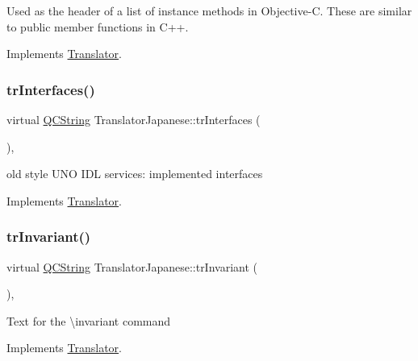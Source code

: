 Used as the header of a list of instance methods in Objective-\/C. These are similar to public member functions in C++. 

Implements \mbox{\hyperlink{class_translator}{Translator}}.

\mbox{\label{class_translator_japanese_ab202913125e78765f22b022c382e1c75}} 
\subsubsection{\texorpdfstring{trInterfaces()}{trInterfaces()}}
{\footnotesize\ttfamily virtual \mbox{\hyperlink{class_q_c_string}{Q\+C\+String}} Translator\+Japanese\+::tr\+Interfaces (\begin{DoxyParamCaption}{ }\end{DoxyParamCaption})\hspace{0.3cm}{\ttfamily [inline]}, {\ttfamily [virtual]}}

old style U\+NO I\+DL services\+: implemented interfaces 

Implements \mbox{\hyperlink{class_translator}{Translator}}.

\mbox{\label{class_translator_japanese_ad4cd27f745b3a8024d8c2886a9df93fd}} 
\subsubsection{\texorpdfstring{trInvariant()}{trInvariant()}}
{\footnotesize\ttfamily virtual \mbox{\hyperlink{class_q_c_string}{Q\+C\+String}} Translator\+Japanese\+::tr\+Invariant (\begin{DoxyParamCaption}{ }\end{DoxyParamCaption})\hspace{0.3cm}{\ttfamily [inline]}, {\ttfamily [virtual]}}

Text for the \textbackslash{}invariant command 

Implements \mbox{\hyperlink{class_translator}{Translator}}.

\mbox{\label{class_translator_japanese_a50d8792e98dbd99347bf81cd6cb59bd2}} 
